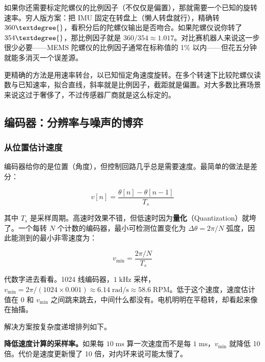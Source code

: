 如果你还需要标定陀螺仪的比例因子（不仅仅是偏置），那就需要一个已知的旋转速率。穷人版方案：把 IMU 固定在转盘上（懒人转盘就行），精确转 $360\textdegree{}$，看积分后的陀螺仪输出是否吻合。如果陀螺仪说你转了 $354\textdegree{}$，那比例因子就是 $360/354 \approx 1.017$。对比赛机器人来说这一步很少必要——MEMS 陀螺仪的比例因子通常在标称值的 1\% 以内——但花五分钟就能多消灭一个误差源。

更精确的方法是用速率转台，以已知恒定角速度旋转。在多个转速下比较陀螺仪读数与已知速率，拟合直线，斜率就是比例因子，截距就是偏置。对大多数比赛场景来说这过于奢侈了，不过传感器厂商就是这么标定的。

\subsection{编码器：分辨率与噪声的博弈}

\subsubsection{从位置估计速度}

编码器给你的是位置（角度），但控制回路几乎总是需要速度。最简单的做法是差分：

\begin{equation}
v[n] = \frac{\theta[n] - \theta[n-1]}{T_s}
\end{equation}

其中 $T_s$ 是采样周期。高速时效果不错，但低速时因为\textbf{量化}（Quantization）就垮了。一个每转 $N$ 个计数的编码器，最小可检测位置变化为 $\Delta\theta = 2\pi / N$ 弧度，因此能测到的最小非零速度为：

\begin{equation}
v_{\min} = \frac{2\pi / N}{T_s}
\end{equation}

代数字进去看看。1024 线编码器，$1\;\mathrm{kHz}$ 采样，$v_{\min} = 2\pi / (1024 \times 0.001) \approx 6.14\;\mathrm{rad/s} \approx 58.6\;\mathrm{RPM}$。低于这个速度，速度估计值在 0 和 $v_{\min}$ 之间跳来跳去，中间什么都没有。电机明明在平稳转，却看起来像在抽搐。

解决方案按复杂度递增排列如下。

\textbf{降低速度计算的采样率。}如果每 $10\;\mathrm{ms}$ 算一次速度而不是每 $1\;\mathrm{ms}$，$v_{\min}$ 就降低 10 倍。代价是速度更新慢了 10 倍，对内环来说可能太慢了。


